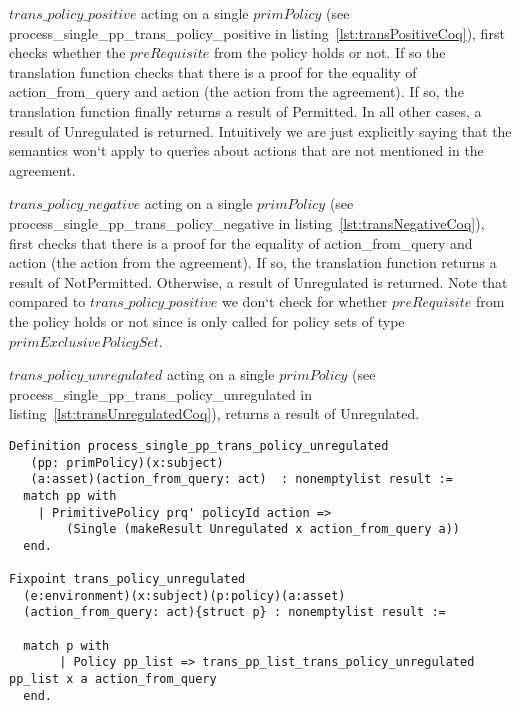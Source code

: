 $trans\_policy\_positive$ acting on a single $primPolicy$ (see process_single_pp_trans_policy_positive in listing~\ref{lst:transPositiveCoq}), first checks whether the $preRequisite$ from the policy holds or not. If so the translation function checks that there is a proof for the equality of action_from_query and action (the action from the agreement). If so, the translation function finally returns a result of Permitted. In all other cases, a result of Unregulated is returned. Intuitively we are just explicitly saying that the semantics won`t apply to queries about actions that are not mentioned in the agreement.

$trans\_policy\_negative$ acting on a single $primPolicy$ (see process_single_pp_trans_policy_negative in listing~\ref{lst:transNegativeCoq}), first checks that there is a proof for the equality of action_from_query and action (the action from the agreement). If so, the translation function returns a result of NotPermitted. Otherwise, a result of Unregulated is returned. Note that compared to $trans\_policy\_positive$ we don`t check for whether $preRequisite$ from the policy holds or not since is only called for policy sets of type $primExclusivePolicySet$.

$trans\_policy\_unregulated$ acting on a single $primPolicy$ (see process_single_pp_trans_policy_unregulated in listing~\ref{lst:transUnregulatedCoq}), returns a result of Unregulated.

\begin{lstlisting}
Definition process_single_pp_trans_policy_unregulated
   (pp: primPolicy)(x:subject)
   (a:asset)(action_from_query: act)  : nonemptylist result :=
  match pp with
    | PrimitivePolicy prq' policyId action =>
        (Single (makeResult Unregulated x action_from_query a))
  end.

Fixpoint trans_policy_unregulated
  (e:environment)(x:subject)(p:policy)(a:asset)
  (action_from_query: act){struct p} : nonemptylist result :=

  match p with
       | Policy pp_list => trans_pp_list_trans_policy_unregulated pp_list x a action_from_query
  end.

\end{lstlisting}


